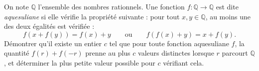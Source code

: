 On note $\mathbb{Q}$ l'ensemble des nombres rationnels. Une fonction $f \colon \mathbb{Q} \to \mathbb{Q}$ est
dite \emph{aquesuliane} si elle vérifie la propriété suivante : pour tout $x, y \in \mathbb{Q}$, au moins
une des deux égalités est vérifiée :
\[
f(x + f(y)) = f(x) + y \qquad \text{ou} \qquad f(f(x) + y) = x + f(y).
\]
Démontrer qu'il existe un entier $c$ tel que pour toute fonction aquesuliane $f$, la quantité
$f(r) + f(-r)$ prenne au plus $c$ valeurs distinctes lorsque $r$ parcourt $\mathbb{Q}$, et déterminer la
plus petite valeur possible pour $c$ vérifiant cela.
